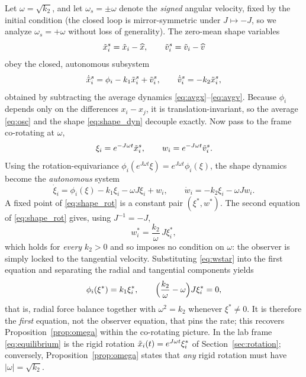 Let $\omega=\sqrt{k_2}$, and let $\omega_s=\pm\omega$ denote the \emph{signed} angular velocity,
fixed by the initial condition (the closed loop is mirror-symmetric under $J\mapsto-J$, so we
analyze $\omega_s=+\omega$ without loss of generality). The zero-mean shape variables
\begin{equation}
  \tilde{x}_i^s=\tilde{x}_i-\widehat{x},\qquad \tilde{v}_i^s=\tilde{v}_i-\widehat{v}
  \label{eq:shape}
\end{equation}
obey the closed, autonomous subsystem
\begin{equation}
  \dot{\tilde{x}}_i^s=\phi_i-k_1\tilde{x}_i^s+\tilde{v}_i^s,\qquad
  \dot{\tilde{v}}_i^s=-k_2\tilde{x}_i^s,
  \label{eq:shape_dyn}
\end{equation}
obtained by subtracting the average dynamics \eqref{eq:avgx}--\eqref{eq:avgv}. Because $\phi_i$
depends only on the differences $x_i-x_j$, it is translation-invariant, so the average
\eqref{eq:osc} and the shape \eqref{eq:shape_dyn} decouple exactly. Now pass to the frame co-rotating
at $\omega$,
\begin{equation}
  \xi_i=e^{-J\omega t}\tilde{x}_i^s,\qquad w_i=e^{-J\omega t}\tilde{v}_i^s .
  \label{eq:corotating}
\end{equation}
Using the rotation-equivariance $\phi_i(e^{J\omega t}\xi)=e^{J\omega t}\phi_i(\xi)$, the shape
dynamics become the \emph{autonomous} system
\begin{equation}
  \dot{\xi}_i=\phi_i(\xi)-k_1\xi_i-\omega J\xi_i+w_i,\qquad
  \dot{w}_i=-k_2\xi_i-\omega Jw_i .
  \label{eq:shape_rot}
\end{equation}
A fixed point of \eqref{eq:shape_rot} is a constant pair $(\xi^*,w^*)$. The second equation of
\eqref{eq:shape_rot} gives, using $J^{-1}=-J$,
\begin{equation}
  w_i^*=\frac{k_2}{\omega}\,J\xi_i^* ,
  \label{eq:wstar}
\end{equation}
which holds for \emph{every} $k_2>0$ and so imposes no condition on $\omega$: the observer is simply
locked to the tangential velocity. Substituting \eqref{eq:wstar} into the first equation and
separating the radial and tangential components yields
\begin{equation}
  \phi_i(\xi^*)=k_1\xi_i^*,
  \qquad
  \Bigl(\frac{k_2}{\omega}-\omega\Bigr)J\xi_i^*=0 ,
  \label{eq:equilibrium}
\end{equation}
that is, radial force balance together with $\omega^2=k_2$ whenever $\xi^*\ne0$. It is therefore the
\emph{first} equation, not the observer equation, that pins the rate; this recovers
Proposition~\ref{prop:omega} within the co-rotating picture. In the lab frame \eqref{eq:equilibrium} is the rigid
rotation $\tilde{x}_i(t)=e^{J\omega t}\xi_i^*$ of Section~\ref{sec:rotation}; conversely,
Proposition~\ref{prop:omega} states that \emph{any} rigid rotation must have
$|\omega|=\sqrt{k_2}$.

